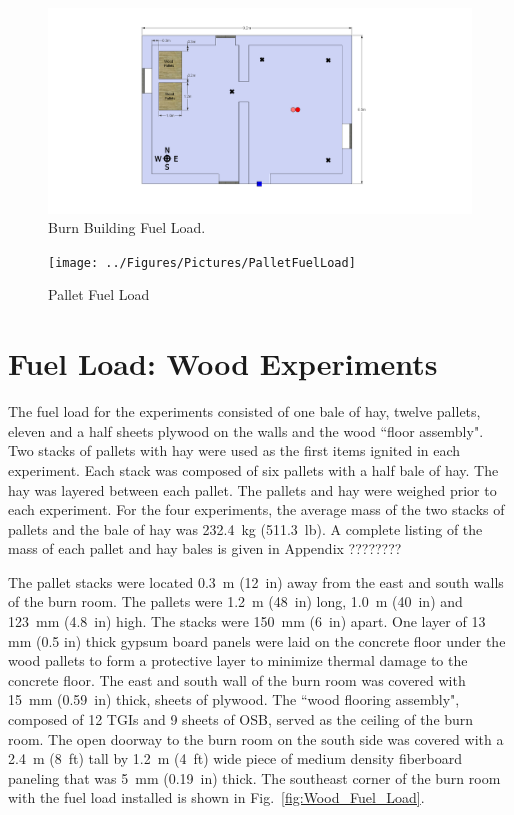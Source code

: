 \documentclass[12pt,oneside]{book}
\begin{document}
\begin{figure}[!ht]
	\includegraphics[width=6in]{../Figures/Pictures/DelCoBurnBuildingFuelLoad}
	\caption{Burn Building Fuel Load.}
	\label{fig:Burn_Building_Fuel_Load}
\end{figure}

\begin{figure}[!ht]
	\texttt{[image: ../Figures/Pictures/PalletFuelLoad]}
	\caption{Pallet Fuel Load}
	\label{fig:Pallet_Fuel_Load}
\end{figure}

\section{Fuel Load: Wood Experiments}
\label{sec:Fuel_Load:_Wood_Experiments} 

The fuel load for the experiments consisted of one bale of hay, twelve pallets, eleven and a half sheets plywood on the walls and the wood ``floor assembly". Two stacks of pallets with hay were used as the first items ignited in each experiment.  Each stack was composed of six pallets with a half bale of hay.  The hay was layered between each pallet.  The pallets and hay were weighed prior to each experiment.  For the four experiments, the average mass of the two stacks of pallets and the bale of hay was 232.4~kg (511.3~lb).  A complete listing of the mass of each pallet and hay bales is given in Appendix ????????
  
The pallet stacks were located 0.3~m (12~in) away from the east and south walls of the burn room.  The pallets were 1.2~m (48~in) long, 1.0~m (40~in) and 123~mm (4.8~in) high.  The stacks were 150~mm (6~in) apart.  One layer of 13 mm (0.5 in) thick gypsum board panels were laid on the concrete floor under the wood pallets to form a protective layer to minimize thermal damage to the concrete floor.
The east and south wall of the burn room was covered with 15~mm (0.59~in) thick, sheets of plywood.  The ``wood flooring assembly", composed of 12 TGIs and 9 sheets of OSB, served as the ceiling of the burn room.  The open doorway to the burn room on the south side was covered with a 2.4~m (8~ft) tall by 1.2~m (4~ft) wide piece of medium density fiberboard paneling that was 5~mm (0.19~in) thick.  The southeast corner of the burn room with the fuel load installed is shown in Fig.~\ref{fig:Wood_Fuel_Load}.
\end{document}
